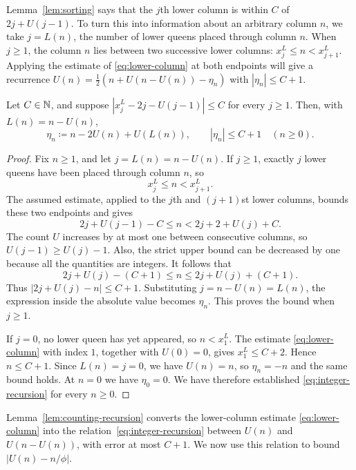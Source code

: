 Lemma~\ref{lem:sorting} says that the $j$th lower column is within $C$ of
$2j+U(j-1)$. To turn this into information about an arbitrary column
$n$, we take $j=L(n)$, the number of lower queens placed through column
$n$. When $j\ge1$, the column $n$ lies between two successive lower columns: $x_j^L\le n<x_{j+1}^L$.
Applying the estimate of \eqref{eq:lower-column} at both endpoints will give a recurrence
$U(n)=\frac{1}{2}(n+U(n-U(n))-\eta_n)$ with $|\eta_n|\le C+1$.
\begin{lemma}\label{lem:counting-recursion}
Let $C\in\mathbb N$, and suppose
$|x_j^L-2j-U(j-1)|\le C$ for every $j\ge1$. Then, with
$L(n)=n-U(n)$,
\begin{equation}\label{eq:integer-recursion}
 \eta_n\coloneqq n-2U(n)+U(L(n)),\qquad |\eta_n|\le C+1\quad(n\ge0).
\end{equation}
\end{lemma}
\begin{proof}
Fix $n\ge1$, and let
$j=L(n)=n-U(n)$. If $j\ge1$, exactly $j$ lower queens have been placed
through column $n$, so
\[
 x_j^L\le n<x_{j+1}^L.
\]
The assumed estimate, applied to the $j$th and $(j+1)$st lower
columns, bounds these two endpoints and gives
\[
 2j+U(j-1)-C\le n<2j+2+U(j)+C.
\]
The count $U$ increases by at most one between consecutive columns, so
$U(j-1)\ge U(j)-1$. Also, the strict upper bound can be decreased by one
because all the quantities are integers. It follows that
\[
 2j+U(j)-(C+1)\le n\le2j+U(j)+(C+1).
\]
Thus $|2j+U(j)-n|\le C+1$. Substituting $j=n-U(n)=L(n)$,
the expression inside the absolute value becomes $\eta_n$.
This proves the bound when $j\ge1$.

If $j=0$, no lower queen has yet appeared, so $n<x_1^L$. The estimate
\eqref{eq:lower-column} with index $1$, together with $U(0)=0$, gives
$x_1^L\le C+2$. Hence $n\le C+1$. Since $L(n)=j=0$, we have $U(n)=n$, 
so $\eta_n=-n$ and the same bound holds. At $n=0$ we have $\eta_0=0$.
We have therefore established \eqref{eq:integer-recursion} for every
$n\ge0$.
\end{proof}

Lemma~\ref{lem:counting-recursion} converts the lower-column estimate
\eqref{eq:lower-column} into the relation~\eqref{eq:integer-recursion}
between $U(n)$ and $U(n-U(n))$, with error at most $C+1$.
We now use this relation to bound $|U(n)-n/\phi|$.

